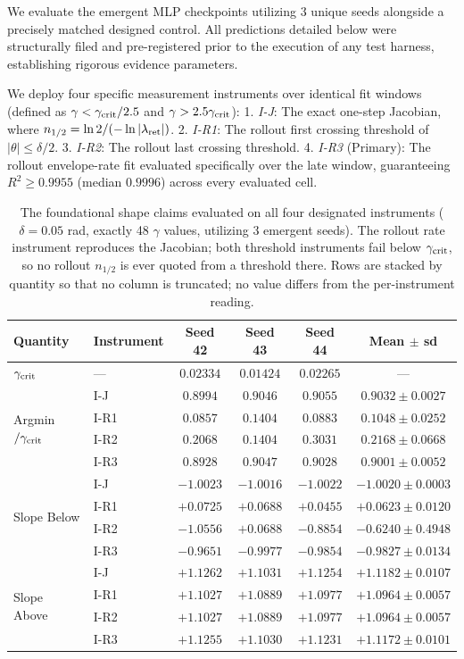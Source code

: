 \documentclass{article}
\begin{document}
We evaluate the emergent MLP checkpoints utilizing 3 unique seeds alongside a precisely matched designed control. All predictions detailed below were structurally filed and pre-registered prior to the execution of any test harness, establishing rigorous evidence parameters.

We deploy four specific measurement instruments over identical fit windows (defined as $\gamma<\gamma_{\rm crit}/2.5$ and $\gamma>2.5\gamma_{\rm crit}$):
1.  \emph{I-J}: The exact one-step Jacobian, where $n_{1/2}=\ln2/(-\ln|\lambda_{\rm ret}|)$.
2.  \emph{I-R1}: The rollout first crossing threshold of $|\theta|\le\delta/2$.
3.  \emph{I-R2}: The rollout last crossing threshold.
4.  \emph{I-R3} (Primary): The rollout envelope-rate fit evaluated specifically over the late window, guaranteeing $R^2\ge0.9955$ (median $0.9996$) across every evaluated cell.

\begin{table}[!htb]\centering\small
\caption{The foundational shape claims evaluated on all four designated instruments ($\delta=0.05$ rad, exactly 48 $\gamma$ values, utilizing 3 emergent seeds). The rollout rate instrument reproduces the Jacobian; both threshold instruments fail below $\gamma_{\rm crit}$, so no rollout $n_{1/2}$ is ever quoted from a threshold there. Rows are stacked by quantity so that no column is truncated; no value differs from the per-instrument reading.}
\begin{tabular}{llcccc}
\toprule
Quantity & Instrument & Seed 42 & Seed 43 & Seed 44 & Mean $\pm$ sd\\
\midrule
$\gamma_{\rm crit}$ & --- & $0.02334$ & $0.01424$ & $0.02265$ & ---\\
\midrule
\multirow{4}{*}{Argmin$/\gamma_{\rm crit}$} & I-J & $0.8994$ & $0.9046$ & $0.9055$ & $0.9032\pm0.0027$\\
 & I-R1 & $0.0857$ & $0.1404$ & $0.0883$ & $0.1048\pm0.0252$\\
 & I-R2 & $0.2068$ & $0.1404$ & $0.3031$ & $0.2168\pm0.0668$\\
 & I-R3 & $0.8928$ & $0.9047$ & $0.9028$ & $0.9001\pm0.0052$\\
\midrule
\multirow{4}{*}{Slope Below} & I-J & $-1.0023$ & $-1.0016$ & $-1.0022$ & $-1.0020\pm0.0003$\\
 & I-R1 & $+0.0725$ & $+0.0688$ & $+0.0455$ & $+0.0623\pm0.0120$\\
 & I-R2 & $-1.0556$ & $+0.0688$ & $-0.8854$ & $-0.6240\pm0.4948$\\
 & I-R3 & $-0.9651$ & $-0.9977$ & $-0.9854$ & $-0.9827\pm0.0134$\\
\midrule
\multirow{4}{*}{Slope Above} & I-J & $+1.1262$ & $+1.1031$ & $+1.1254$ & $+1.1182\pm0.0107$\\
 & I-R1 & $+1.1027$ & $+1.0889$ & $+1.0977$ & $+1.0964\pm0.0057$\\
 & I-R2 & $+1.1027$ & $+1.0889$ & $+1.0977$ & $+1.0964\pm0.0057$\\
 & I-R3 & $+1.1255$ & $+1.1030$ & $+1.1231$ & $+1.1172\pm0.0101$\\
\bottomrule
\end{tabular}
\end{table}
\end{document}
